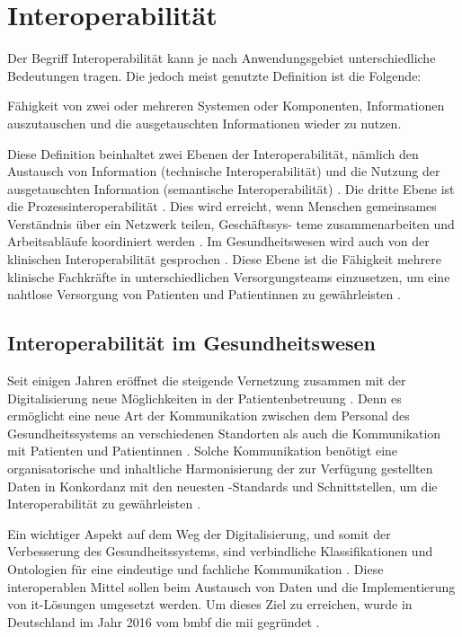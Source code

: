 \section{Interoperabilität} \label{sec:interop}

Der Begriff Interoperabilität kann je nach Anwendungsgebiet unterschiedliche Bedeutungen tragen. Die jedoch meist genutzte Definition ist die Folgende:

\glqq Fähigkeit von zwei oder mehreren Systemen oder Komponenten, Informationen auszutauschen und die ausgetauschten Informationen wieder zu nutzen.\grqq{} \cite{interopdef}

Diese Definition beinhaltet zwei Ebenen der Interoperabilität, nämlich den Austausch von Information (technische Interoperabilität) und die Nutzung der ausgetauschten Information (semantische Interoperabilität) \cite{telemedizin}. Die dritte Ebene ist die Prozessinteroperabilität \cite{ehealtOk}. Dies wird erreicht, wenn Menschen gemeinsames Verständnis über ein Netzwerk teilen, Geschäftssys- teme zusammenarbeiten und Arbeitsabläufe koordiniert werden \cite{interop}. Im Gesundheitswesen wird auch von der klinischen Interoperabilität gesprochen \cite{ehealtOk}. Diese Ebene ist die Fähigkeit mehrere klinische Fachkräfte in unterschiedlichen Versorgungsteams einzusetzen, um eine nahtlose Versorgung von Patienten und Patientinnen zu gewährleisten \cite{interop}.

\subsection{Interoperabilität im Gesundheitswesen} \label{subsec:interopgesund}

Seit einigen Jahren eröffnet die steigende Vernetzung zusammen mit der Digitalisierung neue Möglichkeiten in der Patientenbetreuung \cite{telemedizin}. Denn es ermöglicht eine neue Art der Kommunikation zwischen dem Personal des Gesundheitssystems an verschiedenen Standorten als auch die Kommunikation mit Patienten und Patientinnen \cite{ehealtOk}. Solche Kommunikation benötigt eine organisatorische und inhaltliche Harmonisierung der zur Verfügung gestellten Daten in Konkordanz mit den neuesten -Standards und Schnittstellen, um die Interoperabilität zu gewährleisten \cite{telemedizin}. 

Ein wichtiger Aspekt auf dem Weg der Digitalisierung, und somit der Verbesserung des Gesundheitssystems, sind verbindliche Klassifikationen und Ontologien für eine eindeutige und fachliche Kommunikation \cite{ehealtOk}. Diese interoperablen Mittel sollen beim Austausch von Daten und die Implementierung von \ac{it}-Lösungen umgesetzt werden. Um dieses Ziel zu erreichen, wurde in Deutschland im Jahr 2016 vom \ac{bmbf} die \ac{mii} gegründet \cite{telemedizin}. 

